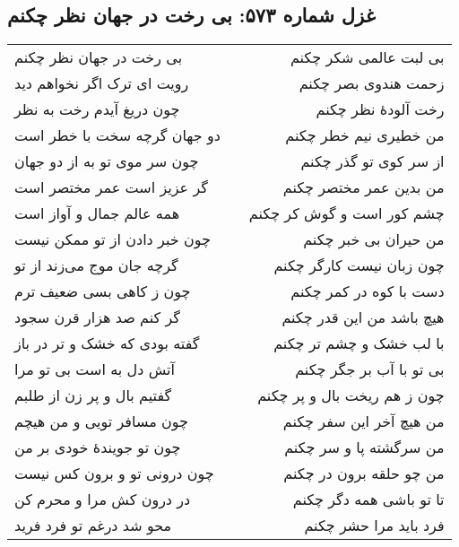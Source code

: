 \begin{center}
\section*{غزل شماره ۵۷۳: بی رخت در جهان نظر چکنم}
\label{sec:573}
\begin{longtable}{l p{0.5cm} r}
بی رخت در جهان نظر چکنم
&&
بی لبت عالمی شکر چکنم
\\
رویت ای ترک اگر نخواهم دید
&&
زحمت هندوی بصر چکنم
\\
چون دریغ آیدم رخت به نظر
&&
رخت آلودهٔ نظر چکنم
\\
دو جهان گرچه سخت با خطر است
&&
من خطیری نیم خطر چکنم
\\
چون سر موی تو به از دو جهان
&&
از سر کوی تو گذر چکنم
\\
گر عزیز است عمر مختصر است
&&
من بدین عمر مختصر چکنم
\\
همه عالم جمال و آواز است
&&
چشم کور است و گوش کر چکنم
\\
چون خبر دادن از تو ممکن نیست
&&
من حیران بی خبر چکنم
\\
گرچه جان موج می‌زند از تو
&&
چون زبان نیست کارگر چکنم
\\
چون ز کاهی بسی ضعیف ترم
&&
دست با کوه در کمر چکنم
\\
گر کنم صد هزار قرن سجود
&&
هیچ باشد من این قدر چکنم
\\
گفته بودی که خشک و تر در باز
&&
با لب خشک و چشم تر چکنم
\\
آتش دل به است بی تو مرا
&&
بی تو با آب بر جگر چکنم
\\
گفتیم بال و پر زن از طلبم
&&
چون ز هم ریخت بال و پر چکنم
\\
چون مسافر تویی و من هیچم
&&
من هیچ آخر این سفر چکنم
\\
چون تو جویندهٔ خودی بر من
&&
من سرگشته پا و سر چکنم
\\
چون درونی تو و برون کس نیست
&&
من چو حلقه برون در چکنم
\\
در درون کش مرا و محرم کن
&&
تا تو باشی همه دگر چکنم
\\
محو شد درغم تو فرد فرید
&&
فرد باید مرا حشر چکنم
\\
\end{longtable}
\end{center}
